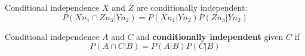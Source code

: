 \documentclass{beamer}
\newcommand{\crish}{\color{reddish}}
\newcommand{\cbla}{\color{black}}
\begin{document}
\begin{frame}{Conditional independence}
\crish$X$\cbla{} and \crish$Z$\cbla{} are conditionally independent:
\crish
$$
P(Xn_1\cap{}Zn_3|Yn_2)=P(Xn_1|Yn_2)P(Zn_3|Yn_2)
$$
\cbla
\end{frame}

\begin{frame}{Conditional independence}
  \crish$A$\cbla{} and  \crish$C$\cbla{} and \textbf{conditionally independent} given \crish$C$\cbla{} if
  \crish$$P(A\cap{}C|B)=P(A|B)P(C|B)$$\cbla{}
  \end{frame}
\end{document}
